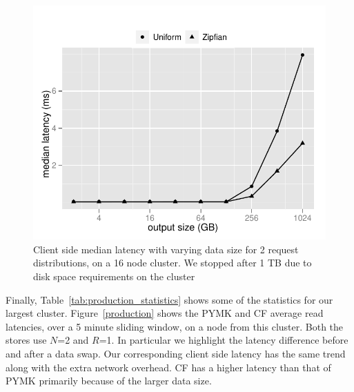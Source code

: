 \begin{figure}
  \centering
    \includegraphics[scale=0.55]{images/search_16node.pdf}
  \caption{Client side median latency with varying data size for 2 request distributions, on a 16 node cluster. We stopped after 1 TB due to disk space requirements on the cluster}
  \label{16search}
\end{figure}

Finally, Table~\ref{tab:production_statistics} shows some of the statistics 
for our largest cluster. Figure~\ref{production} shows the PYMK and CF average
read latencies, over a 5 minute sliding window, on a node from this cluster. Both
the stores use $N$=2 and $R$=1. In particular we highlight the latency difference 
before and after a data swap. Our corresponding client side latency has the same
trend along with the extra network overhead. CF has a higher latency than that of 
PYMK primarily because of the larger data size.

